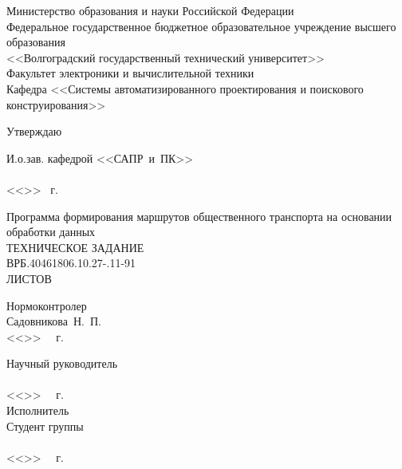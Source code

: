 \thispagestyle{empty}
\begin{center}
    Министерство образования и науки Российской Федерации \\
    Федеральное государственное бюджетное образовательное учреждение высшего образования\\
    <<Волгоградский государственный технический университет>>\\
    Факультет электроники и вычислительной техники\\
    Кафедра <<Системы автоматизированного проектирования и поискового конструирования>>
    \vspace{1em}
\end{center}
\begin{flushright}
    \begin{center}
        \hspace*{10.5em}Утверждаю
    \end{center}
    И.о.зав. кафедрой <<САПР~и~ПК>>\\
    \quad{}\\
    <<\underline{\hspace{2em}}>> \underline{\hspace{7.5em}} \the\year\ г.
\end{flushright}
\begin{center}
    Программа формирования маршрутов общественного транспорта на основании обработки данных\\
    ТЕХНИЧЕСКОЕ ЗАДАНИЕ\\
    \vspace{2em}
    ВРБ.40461806.10.27-\SPECIFICATION.11-91\\
    ЛИСТОВ \SPAGES
\end{center}
\vspace{5em}
\begin{minipage}[t]{0.6\textwidth}
    \vspace{4em}
    \begin{flushleft}
        Нормоконтролер\\
        Садовникова~Н.~П.\\
        <<\LINE{1.5em}>>\ \LINE{7em} \the\year\ г.
    \end{flushleft}
\end{minipage}
\begin{minipage}[t]{0.39\textwidth}
    \begin{flushleft}
        Научный руководитель\\
        \underline{}\\
        <<\LINE{1.5em}>>\ \LINE{7em} \the\year\ г.\\
        Исполнитель\\
        Студент группы\\
        \underline{}\\
        <<\LINE{1.5em}>>\ \LINE{7em} \the\year\ г.\\
    \end{flushleft}
\end{minipage}
